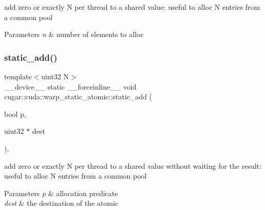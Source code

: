add zero or exactly N per thread to a shared value\+: useful to alloc N entries from a common pool


\begin{DoxyParams}{Parameters}
{\em n} & number of elements to alloc \\
\hline
\end{DoxyParams}
\mbox{\label{structcugar_1_1cuda_1_1warp__static__atomic_a2e8efd252f9f489e242e6724b41ed67a}} 
\subsubsection{\texorpdfstring{static\+\_\+add()}{static\_add()}\hspace{0.1cm}{\footnotesize\ttfamily [1/2]}}
{\footnotesize\ttfamily template$<$uint32 N$>$ \\
\+\_\+\+\_\+device\+\_\+\+\_\+ static \+\_\+\+\_\+forceinline\+\_\+\+\_\+ void cugar\+::cuda\+::warp\+\_\+static\+\_\+atomic\+::static\+\_\+add (\begin{DoxyParamCaption}\item[{bool}]{p,  }\item[{uint32 $\ast$}]{dest }\end{DoxyParamCaption})\hspace{0.3cm}{\ttfamily [inline]}, {\ttfamily [static]}}

add zero or exactly N per thread to a shared value without waiting for the result\+: useful to alloc N entries from a common pool


\begin{DoxyParams}{Parameters}
{\em p} & allocation predicate \\
\hline
{\em dest} & the destination of the atomic \\
\hline
\end{DoxyParams}
\mbox{\label{structcugar_1_1cuda_1_1warp__static__atomic_aeba3edd9b324231a90e45675e46a565d}} 
